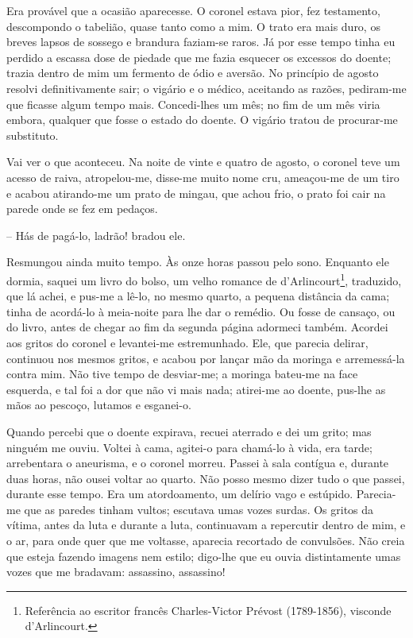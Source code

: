 Era provável que a ocasião aparecesse. O coronel estava pior, fez
testamento, descompondo o tabelião, quase tanto como a mim. O trato era
mais duro, os breves lapsos de sossego e brandura faziam-se raros. Já
por esse tempo tinha eu perdido a escassa dose de piedade que me fazia
esquecer os excessos do doente; trazia dentro de mim um fermento de ódio
e aversão. No princípio de agosto resolvi definitivamente sair; o
vigário e o médico, aceitando as razões, pediram-me que ficasse algum
tempo mais. Concedi-lhes um mês; no fim de um mês viria embora, qualquer
que fosse o estado do doente. O vigário tratou de procurar-me
substituto.

Vai ver o que aconteceu. Na noite de vinte e quatro de agosto, o coronel
teve um acesso de raiva, atropelou-me, disse-me muito nome cru,
ameaçou-me de um tiro e acabou atirando-me um prato de mingau, que achou
frio, o prato foi cair na parede onde se fez em pedaços.

-- Hás de pagá-lo, ladrão! bradou ele.

Resmungou ainda muito tempo. Às onze horas passou pelo sono. Enquanto
ele dormia, saquei um livro do bolso, um velho romance de
d'Arlincourt\footnote{Referência ao escritor francês Charles-Victor
  Prévost (1789-1856), visconde d'Arlincourt.}, traduzido, que lá achei,
e pus-me a lê-lo, no mesmo quarto, a pequena distância da cama; tinha de
acordá-lo à meia-noite para lhe dar o remédio. Ou fosse de cansaço, ou
do livro, antes de chegar ao fim da segunda página adormeci também.
Acordei aos gritos do coronel e levantei-me estremunhado. Ele, que
parecia delirar, continuou nos mesmos gritos, e acabou por lançar mão da
moringa e arremessá-la contra mim. Não tive tempo de desviar-me; a
moringa bateu-me na face esquerda, e tal foi a dor que não vi mais nada;
atirei-me ao doente, pus-lhe as mãos ao pescoço, lutamos e esganei-o.

Quando percebi que o doente expirava, recuei aterrado e dei um grito;
mas ninguém me ouviu. Voltei à cama, agitei-o para chamá-lo à vida, era
tarde; arrebentara o aneurisma, e o coronel morreu. Passei à sala
contígua e, durante duas horas, não ousei voltar ao quarto. Não posso
mesmo dizer tudo o que passei, durante esse tempo. Era um atordoamento,
um delírio vago e estúpido. Parecia-me que as paredes tinham vultos;
escutava umas vozes surdas. Os gritos da vítima, antes da luta e durante
a luta, continuavam a repercutir dentro de mim, e o ar, para onde quer
que me voltasse, aparecia recortado de convulsões. Não creia que esteja
fazendo imagens nem estilo; digo-lhe que eu ouvia distintamente umas
vozes que me bradavam: assassino, assassino!

